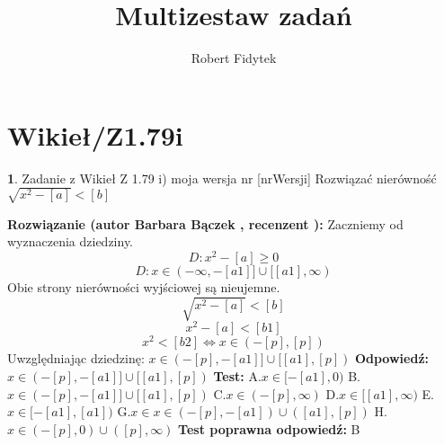 \documentclass[12pt, a4paper]{article}
\title{Multizestaw zadań}
\author{Robert Fidytek}
\date{}
\theoremstyle{definition} %
\newtheorem{zad}{}
\newcommand{\kategoria}[1]{\section{#1}} %
\newcommand{\zadStart}[1]{\begin{zad}#1\newline} %
\newcommand{\zadStop}{\end{zad}}   %
\newcommand{\rozwStart}[2]{\noindent \textbf{Rozwiązanie (autor #1 , recenzent #2): }\newline} %
\newcommand{\rozwStop}{\newline}                                            %
\newcommand{\odpStart}{\noindent \textbf{Odpowiedź:}\newline}    %
\newcommand{\odpStop}{\newline}                                             %
\newcommand{\testStart}{\noindent \textbf{Test:}\newline} %
\newcommand{\testStop}{\newline} %
\newcommand{\kluczStart}{\noindent \textbf{Test poprawna odpowiedź:}\newline} %
\newcommand{\kluczStop}{\newline} %
\begin{document}
\maketitle


\kategoria{Wikieł/Z1.79i}
\zadStart{Zadanie z Wikieł Z 1.79 i) moja wersja nr [nrWersji]}
Rozwiązać nierówność $\sqrt{x^2-[a]}<[b]$
\zadStop
\rozwStart{Barbara Bączek}{}
Zaczniemy od wyznaczenia dziedziny.
$$D:x^2-[a] \geq 0$$
$$D: x \in (-\infty, -[a1]] \cup [[a1], \infty)$$
Obie strony nierówności wyjściowej są nieujemne.
$$\sqrt{x^2-[a]}<[b]$$
$$x^2 - [a] < [b1]$$
$$x^2<[b2] \Leftrightarrow x \in (-[p],[p])$$
Uwzględniając dziedzinę:  
$x \in (-[p],-[a1]] \cup [[a1], [p])$
\rozwStop
\odpStart
$x \in (-[p],-[a1]] \cup [[a1], [p])$
\odpStop
\testStart
A.$x \in [-[a1],0)$
B.$x \in (-[p],-[a1]] \cup [[a1], [p])$
C.$x \in (-[p], \infty)$
D.$x \in [[a1], \infty)$
E.$x \in [-[a1],[a1])$
G.$x \in x \in (-[p],-[a1]) \cup ([a1], [p])$
H.$x \in (-[p],0) \cup ([p], \infty)$
\testStop
\kluczStart
B
\kluczStop
\end{document}
